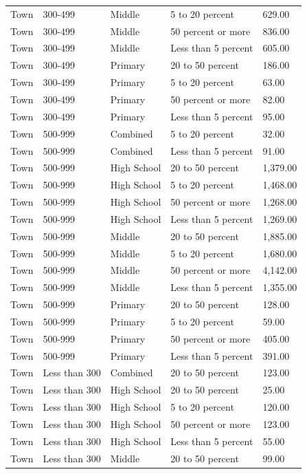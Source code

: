 \documentclass[man]{apa6}
\begin{document}
\begin{table}[tbp]
\begin{center}
\begin{threeparttable}
\begin{tabular}{lllll}
Town & 300-499 & Middle & 5 to 20 percent & 629.00\\
Town & 300-499 & Middle & 50 percent or more & 836.00\\
Town & 300-499 & Middle & Less than 5 percent & 605.00\\
Town & 300-499 & Primary & 20 to 50 percent & 186.00\\
Town & 300-499 & Primary & 5 to 20 percent & 63.00\\
Town & 300-499 & Primary & 50 percent or more & 82.00\\
Town & 300-499 & Primary & Less than 5 percent & 95.00\\
Town & 500-999 & Combined & 5 to 20 percent & 32.00\\
Town & 500-999 & Combined & Less than 5 percent & 91.00\\
Town & 500-999 & High School & 20 to 50 percent & 1,379.00\\
Town & 500-999 & High School & 5 to 20 percent & 1,468.00\\
Town & 500-999 & High School & 50 percent or more & 1,268.00\\
Town & 500-999 & High School & Less than 5 percent & 1,269.00\\
Town & 500-999 & Middle & 20 to 50 percent & 1,885.00\\
Town & 500-999 & Middle & 5 to 20 percent & 1,680.00\\
Town & 500-999 & Middle & 50 percent or more & 4,142.00\\
Town & 500-999 & Middle & Less than 5 percent & 1,355.00\\
Town & 500-999 & Primary & 20 to 50 percent & 128.00\\
Town & 500-999 & Primary & 5 to 20 percent & 59.00\\
Town & 500-999 & Primary & 50 percent or more & 405.00\\
Town & 500-999 & Primary & Less than 5 percent & 391.00\\
Town & Less than 300 & Combined & 20 to 50 percent & 123.00\\
Town & Less than 300 & High School & 20 to 50 percent & 25.00\\
Town & Less than 300 & High School & 5 to 20 percent & 120.00\\
Town & Less than 300 & High School & 50 percent or more & 123.00\\
Town & Less than 300 & High School & Less than 5 percent & 55.00\\
Town & Less than 300 & Middle & 20 to 50 percent & 99.00\\

\end{tabular}
\end{threeparttable}
\end{center}
\end{table}
\end{document}
